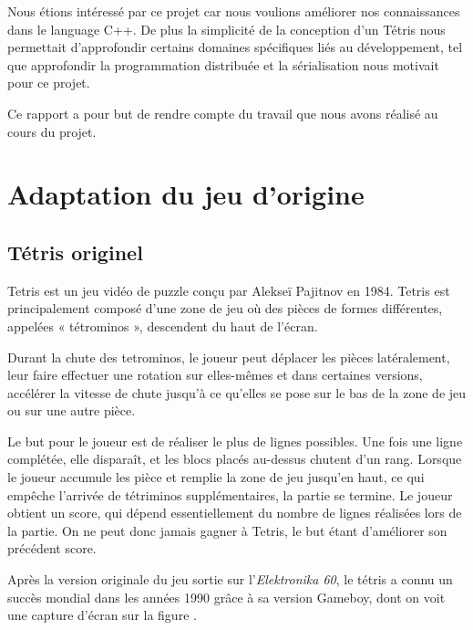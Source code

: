 \documentclass[a4paper, 12pt]{article}
\begin{document}
	\bigskip
	Nous étions intéressé par ce projet car nous voulions améliorer nos connaissances dans le language C++. De plus la simplicité de la conception d'un Tétris nous permettait d'approfondir certains domaines spécifiques liés au développement, tel que approfondir la programmation distribuée et la sérialisation nous motivait pour ce projet.

	\bigskip
	Ce rapport a pour but de rendre compte du travail que nous avons réalisé au cours du projet.

	\newpage

\section{Adaptation du jeu d'origine}
	\subsection{Tétris originel}
		Tetris est un jeu vidéo de puzzle conçu par Alekseï Pajitnov en 1984. Tetris est principalement composé d'une zone de jeu où des pièces de formes différentes, appelées « tétrominos », descendent du haut de l'écran. 
		
		Durant la chute des tetrominos, le joueur peut déplacer les pièces latéralement, leur faire effectuer une rotation sur elles-mêmes et dans certaines versions, accélérer la vitesse de chute jusqu'à ce qu'elles se pose sur le bas de la zone de jeu ou sur une autre pièce. 
		
		Le but pour le joueur est de réaliser le plus de lignes possibles. Une fois une ligne complétée, elle disparaît, et les blocs placés au-dessus chutent d'un rang. 
		Lorsque le joueur accumule les pièce et remplie la zone de jeu jusqu’en haut, ce qui empêche l'arrivée de tétriminos supplémentaires, la partie se termine. Le joueur obtient un score, qui dépend essentiellement du nombre de lignes réalisées lors de la partie. On ne peut donc jamais gagner à Tetris, le but étant d’améliorer son précédent score.

		Après la version originale du jeu sortie sur l'\textit{Elektronika 60}, le tétris a connu un succès mondial dans les années 1990 grâce à sa version Gameboy, dont on voit une capture d'écran sur la figure .
\end{document}

